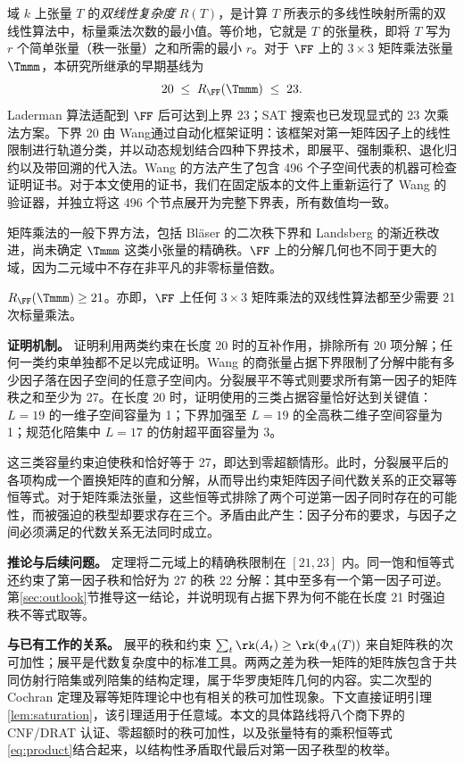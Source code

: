 \documentclass[11pt,a4paper]{article}
\begin{document}
域 $k$ 上张量 $T$ 的\emph{双线性复杂度} $R(T)$，是计算 $T$ 所表示的多线性映射所需的双线性算法中，标量乘法次数的最小值。等价地，它就是 $T$ 的张量秩，即将 $T$ 写为 $r$ 个简单张量（秩一张量）之和所需的最小 $r$。对于 $\FF$ 上的 $3\times3$ 矩阵乘法张量 $\Tmmm$，本研究所继承的早期基线为
\[
  20\;\le\;R_{\FF}(\Tmmm)\;\le\;23.
\]
Laderman 算法适配到 $\FF$ 后可达到上界 23\cite{laderman1976noncommutative}；SAT 搜索也已发现显式的 23 次乘法方案\cite{heule2019waysa}。下界 20 由 Wang\cite{wangautomated}通过自动化框架证明：该框架对第一矩阵因子上的线性限制进行轨道分类，并以动态规划结合四种下界技术，即展平、强制乘积、退化归约以及带回溯的代入法。Wang 的方法产生了包含 496 个子空间代表的机器可检查证明证书。对于本文使用的证书，我们在固定版本的文件上重新运行了 Wang 的验证器，并独立将这 496 个节点展开为完整下界表，所有数值均一致。

矩阵乘法的一般下界方法，包括 Bläser 的二次秩下界和 Landsberg 的渐近秩改进\cite{blaser1999focs,landsberg2012lower}，尚未确定 $\Tmmm$ 这类小张量的精确秩。$\FF$ 上的分解几何也不同于更大的域，因为二元域中不存在非平凡的非零标量倍数。

\begin{theorem}[主要结果]\label{thm:main}
  $R_{\FF}(\Tmmm)\ge21$。亦即，$\FF$ 上任何 $3\times3$ 矩阵乘法的双线性算法都至少需要 21 次标量乘法。
\end{theorem}

\textbf{证明机制。}\quad
证明利用两类约束在长度 20 时的互补作用，排除所有 20 项分解；任何一类约束单独都不足以完成证明。Wang 的商张量占据下界限制了分解中能有多少因子落在因子空间的任意子空间内。分裂展平不等式则要求所有第一因子的矩阵秩之和至少为 27。在长度 20 时，证明使用的三类占据容量恰好达到关键值：$L=19$ 的一维子空间容量为 1；下界加强至 $L=19$ 的全高秩二维子空间容量为 1；规范化陪集中 $L=17$ 的仿射超平面容量为 3。

这三类容量约束迫使秩和恰好等于 27，即达到零超额情形。此时，分裂展平后的各项构成一个置换矩阵的直和分解，从而导出约束矩阵因子间代数关系的正交幂等恒等式。对于矩阵乘法张量，这些恒等式排除了两个可逆第一因子同时存在的可能性，而被强迫的秩型却要求存在三个。矛盾由此产生：因子分布的要求，与因子之间必须满足的代数关系无法同时成立。

\textbf{推论与后续问题。}\quad
定理将二元域上的精确秩限制在 $[21,23]$ 内。同一饱和恒等式还约束了第一因子秩和恰好为 27 的秩 22 分解：其中至多有一个第一因子可逆。第\ref{sec:outlook}节推导这一结论，并说明现有占据下界为何不能在长度 21 时强迫秩不等式取等。

\textbf{与已有工作的关系。}\quad
展平的秩和约束 $\sum_t\rk(A_t)\ge\rk(\Phi_A(T))$ 来自矩阵秩的次可加性；展平是代数复杂度中的标准工具\cite{burgisser1997algebraic,blaser1999focs}。两两之差为秩一矩阵的矩阵族包含于共同仿射行陪集或列陪集的结构定理，属于华罗庚矩阵几何的内容\cite{hua1945geometries,wan1996geometry,pazzis2015hua}。实二次型的 Cochran 定理\cite{cochran1934distribution}及幂等矩阵理论\cite{tian2001rank}中也有相关的秩可加性现象。下文直接证明引理\ref{lem:saturation}，该引理适用于任意域。本文的具体路线将八个商下界的 CNF/DRAT 认证、零超额时的秩可加性，以及张量特有的乘积恒等式\eqref{eq:product}结合起来，以结构性矛盾取代最后对第一因子秩型的枚举。
\end{document}

